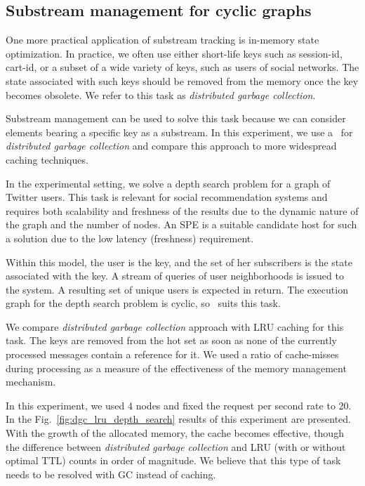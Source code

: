 
\subsection{Substream management for cyclic graphs}

One more practical application of substream tracking is in-memory state optimization. In practice, we often use either short-life keys such as session-id, cart-id, or a subset of a wide variety of keys, such as users of social networks. The state associated with such keys should be removed from the memory once the key becomes obsolete. We refer to this task as \textit{distributed garbage collection}.

Substream management can be used to solve this task because we can consider elements bearing a specific key as a substream. In this experiment, we use a \tracker\ for \textit{distributed garbage collection} and compare this approach to more widespread caching techniques.

In the experimental setting, we solve a depth search problem for a graph of Twitter users. This task is relevant for social recommendation systems and requires both scalability and freshness of the results due to the dynamic nature of the graph and the number of nodes. An SPE is a suitable candidate host for such a solution due to the low latency (freshness) requirement. 

Within this model, the user is the key, and the set of her subscribers is the state associated with the key. A stream of queries of user neighborhoods is issued to the system. A resulting set of unique users is expected in return. The execution graph for the depth search problem is cyclic, so \tracker\ suits this task. 

We compare \textit{distributed garbage collection} approach with LRU caching for this task. The keys are removed from the hot set as soon as none of the currently processed messages contain a reference for it. We used a ratio of cache-misses during processing as a measure of the effectiveness of the memory management mechanism. 

In this experiment, we used 4 nodes and fixed the request per second rate to 20. In the Fig.~\ref{fig:dgc_lru_depth_search} results of this experiment are presented. With the growth of the allocated memory, the cache becomes effective, though the difference between 
\textit{distributed garbage collection} and LRU (with or without optimal TTL) counts in order of magnitude. We believe that this type of task needs to be resolved with GC instead of caching.
